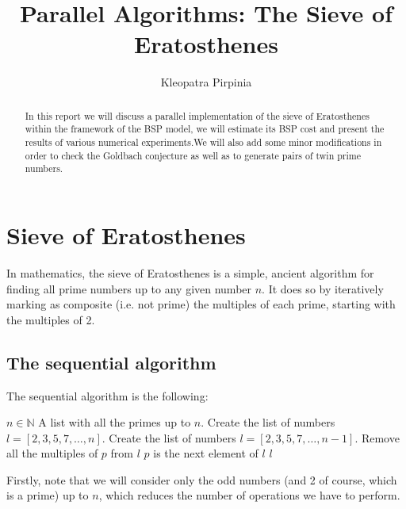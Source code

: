 \documentclass[a4paper,11pt]{article}
\newcommand{\N}{\mathbb{N}}
\begin{document}
\title{Parallel Algorithms: The Sieve of Eratosthenes}
\author{Kleopatra Pirpinia}

\date{}

\maketitle

\begin{abstract}
In this report we will discuss a parallel implementation of the sieve of Eratosthenes within the framework of the BSP model, we will estimate its BSP cost and present the results of various numerical experiments.We will also add some minor modifications in order to check the Goldbach conjecture as well as to generate pairs of twin prime numbers.
\end{abstract}

\tableofcontents

\pagebreak

\section{Sieve of Eratosthenes}

In mathematics, the sieve of Eratosthenes is a simple, ancient algorithm for finding all prime numbers up to any given number $n$. It does so by iteratively marking as composite (i.e. not prime) the multiples of each prime, starting with the multiples of 2.



\subsection{The sequential algorithm}
The sequential algorithm is the following:


\begin{algorithm}
\begin{algorithmic}
\REQUIRE $n \in \N$
\ENSURE A list with all the primes up to $n$.
\STATE
{}
\STATE Create the list of numbers $l=[2,3,5,7,\dots,n]$.
\ELSE
\STATE Create the list of numbers $l=[2,3,5,7,\dots,n-1]$.
\ENDIF
{}
\STATE Remove all the multiples of $p$ from $l$
\STATE $p$ is the next element of $l$
\ENDFOR
\RETURN $l$
\end{algorithmic}
\end{algorithm}

Firstly, note that we will consider only the odd numbers (and 2 of course, which is a prime) up to $n$, which reduces the number of operations we have to perform. 
\end{document}
